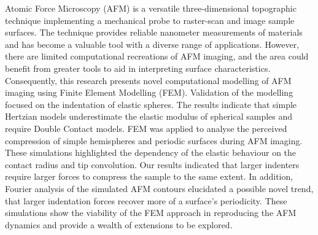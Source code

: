 Atomic Force Microscopy (AFM) is a versatile three-dimensional topographic technique implementing a mechanical probe to raster-scan and image sample surfaces. The technique provides reliable nanometer measurements of materials and has become a valuable tool with a diverse range of applications. However, there are limited computational recreations of AFM imaging, and the area could benefit from greater tools to aid in interpreting surface characteristics. Consequently, this research presents novel computational modelling of AFM imaging using Finite Element Modelling (FEM). Validation of the modelling focused on the indentation of elastic spheres. The results indicate that simple Hertzian models underestimate the elastic modulus of spherical samples and require Double Contact models. FEM was applied to analyse the perceived compression of simple hemispheres and periodic surfaces during AFM imaging. These simulations highlighted the dependency of the elastic behaviour on the contact radius and tip convolution. Our results indicated that larger indenters require larger forces to compress the sample to the same extent. In addition, Fourier analysis of the simulated AFM contours elucidated a possible novel trend, that larger indentation forces recover more of a surface's periodicity. These simulations show the viability of the FEM approach in reproducing the AFM dynamics and provide a wealth of extensions to be explored.